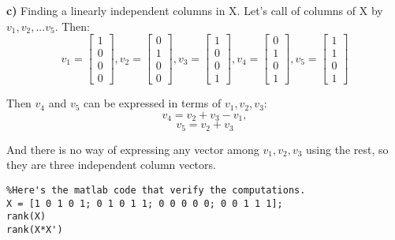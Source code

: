 \documentclass[paper=a4, fontsize=11pt]{scrartcl} %
\numberwithin{equation}{section} %
\numberwithin{figure}{section} %
\numberwithin{table}{section} %
\begin{document}
\textbf{c)} Finding a linearly independent columns in X. 
Let's call of columns of X by $v_1, v_2, ... v_5$. Then: 
$$
v_1=
\begin{bmatrix}
1\\0\\0\\0
\end{bmatrix}
, v_2= 
\begin{bmatrix}
0\\1\\0\\0
\end{bmatrix}
, v_3=
\begin{bmatrix}
1\\0\\0\\1
\end{bmatrix}
, v_4=
\begin{bmatrix}
0\\1\\0\\1
\end{bmatrix}
, v_5=
\begin{bmatrix}
1\\1\\0\\1
\end{bmatrix}
$$

Then $v_4$ and $v_5$ can be expressed in terms of $v_1, v_2, v_3$: 
$$
v_4 = v_2 + v_3 - v_1,  
$$
$$
v_5 = v_2 + v_3
$$

And there is no way of expressing any vector among $v_1,v_2,v_3$ using the rest, so they are three independent column vectors. 


\begin{lstlisting} 
%Here's the matlab code that verify the computations. 
X = [1 0 1 0 1; 0 1 0 1 1; 0 0 0 0 0; 0 0 1 1 1];
rank(X)
rank(X*X')
\end{lstlisting} 
\end{document}
